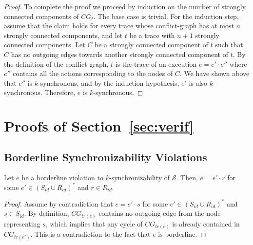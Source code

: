 \begin{proof}
To complete the proof we proceed by induction on the number of strongly connected components of $CG_t$. The base case is trivial. 
 For the induction step, assume that the claim holds for every trace whose conflict-graph has at most $n$ strongly connected components, and 
 let $t$ be a trace with $n+1$ strongly connected components.  
 Let $C$ be a strongly connected component of $t$ such that
$C$ has no outgoing edges towards another strongly connected component of $t$.
%
 By the definition of the conflict-graph, $t$ is the trace of an execution $e=e'\cdot e''$ where $e''$ contains all the actions corresponding to the nodes of $C$. 
 We have shown above that $e''$ is $k$-synchronous, and by the induction hypothesis, $e'$ is also $k$-synchronous. Therefore, $e$ is $k$-synchronous.
\end{proof}

\section{Proofs of Section~\ref{sec:verif}}\label{asec:verif}

\subsection{Borderline Synchronizability Violations}

\begin{lemma}
Let $e$ be a borderline violation to $k$-synchronizability of $\mathcal{S}$. Then, $e = e'\cdot r$ for some $e'\in (S_{id}\cup R_{id})^*$ and $r\in R_{id}$.
\end{lemma}
\begin{proof}
Assume by contradiction that $e=e'\cdot s$ for some $e'\in (S_{id}\cup R_{id})^*$ and $s\in S_{id}$. By definition, $CG_{tr(e)}$ contains no outgoing
edge from the node representing $s$, which implies that any cycle of $CG_{tr(e)}$ is already contained in $CG_{tr(e')}$. This is a contradiction to 
the fact that $e$ is borderline.
\end{proof}

